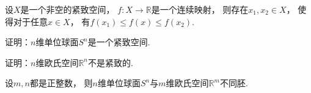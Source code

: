 \begin{theorem}\label{theorem:欧氏空间中的紧致子集.从非空紧致空间到实数域的连续映射1}
设\(X\)是一个非空的紧致空间，
\(f\colon X \to \mathbb{R}\)是一个连续映射，
则存在\(x_1,x_2 \in X\)，
使得对于任意\(x \in X\)，
有\(f(x_1) \leq f(x) \leq f(x_2)\).
\end{theorem}

\begin{example}
证明：\(n\)维单位球面\(S^n\)是一个紧致空间.
\end{example}

\begin{example}
证明：\(n\)维欧氏空间\(\mathbb{R}^n\)不是紧致的.
\end{example}

\begin{theorem}
设\(m,n\)都是正整数，
则\(n\)维单位球面\(S^n\)与\(m\)维欧氏空间\(\mathbb{R}^m\)不同胚.
\end{theorem}

